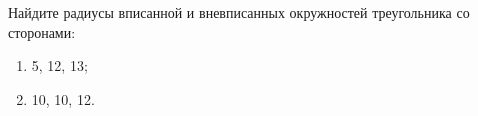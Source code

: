 \begin{ex}
	\begin{condition}
		Найдите радиусы вписанной и вневписанных окружностей треугольника со сторонами: 
		\begin{enumerate}
			\item  5, 12, 13;
			\item 10, 10, 12.
		\end{enumerate} 
	\end{condition}
\end{ex}